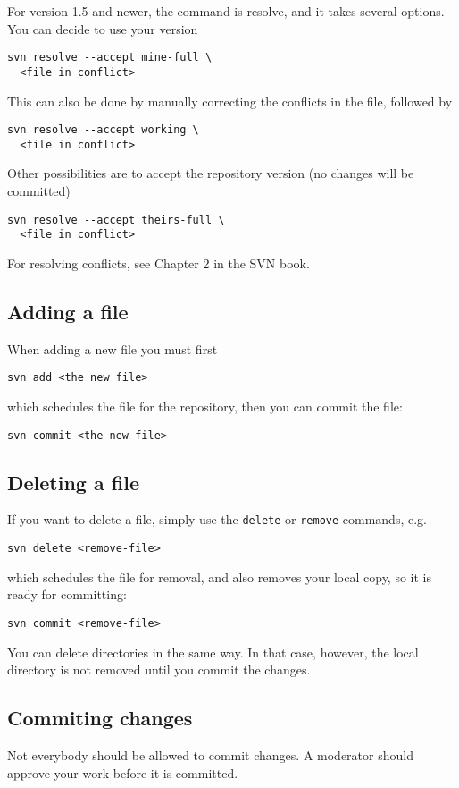 \documentclass[10pt,a4paper,twocolumn]{article}
\begin{document}
For version 1.5 and newer, the command is resolve, and it takes
several options. You can decide to use your version
{\small
\begin{verbatim}
svn resolve --accept mine-full \
  <file in conflict>
\end{verbatim}
}
This can also be done by manually correcting the conflicts in the
file, followed by
{\small
\begin{verbatim}
svn resolve --accept working \
  <file in conflict>
\end{verbatim}
}
Other possibilities are to accept the repository version (no changes
will be committed)
{\small
\begin{verbatim}
svn resolve --accept theirs-full \
  <file in conflict>
\end{verbatim}
}
For resolving conflicts, see Chapter 2 in the SVN book.


\subsection{Adding a file}
When adding a new file you must first
{\small
\begin{verbatim}
svn add <the new file>
\end{verbatim}
}
which schedules the file for the repository, then you can commit the
file:
{\small
\begin{verbatim}
svn commit <the new file>
\end{verbatim}
}


\subsection{Deleting a file}
If you want to delete a file, simply use the \verb#delete# or
\verb#remove# commands, e.g.
{\small
\begin{verbatim}
svn delete <remove-file>
\end{verbatim}
}
which schedules the file for removal, and also removes your local
copy, so it is ready for committing:
{\small
\begin{verbatim}
svn commit <remove-file>
\end{verbatim}
}

You can delete directories in the same way. In that case, however, the
local directory is not removed until you commit the changes.


\subsection{Commiting changes}
Not everybody should be allowed to commit changes. A moderator should
approve your work before it is committed.
\end{document}
